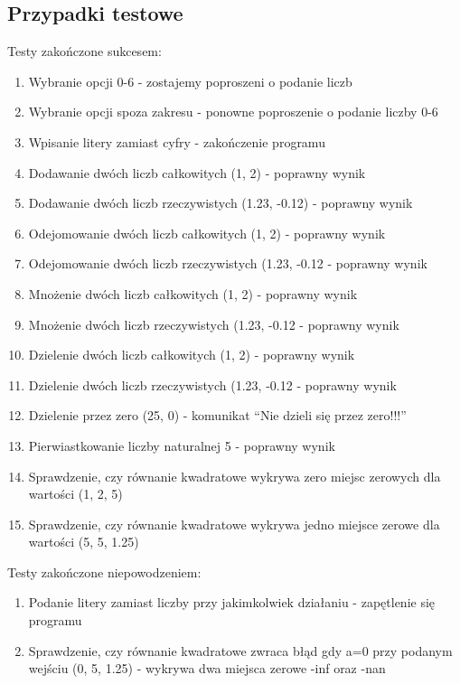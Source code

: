 \documentclass{article}
\begin{document}
\subsection{Przypadki testowe}
Testy zakończone sukcesem:
\begin{enumerate}
\item Wybranie opcji 0-6 - zostajemy poproszeni o podanie liczb
\item Wybranie opcji spoza zakresu - ponowne poproszenie o podanie liczby 0-6
\item Wpisanie litery zamiast cyfry - zakończenie programu
\item Dodawanie dwóch liczb całkowitych (1, 2) - poprawny wynik
\item Dodawanie dwóch liczb rzeczywistych (1.23, -0.12) - poprawny wynik
\item Odejomowanie dwóch liczb całkowitych (1, 2) - poprawny wynik
\item Odejomowanie dwóch liczb rzeczywistych (1.23, -0.12 - poprawny wynik
\item Mnożenie dwóch liczb całkowitych (1, 2) - poprawny wynik
\item Mnożenie dwóch liczb rzeczywistych (1.23, -0.12 - poprawny wynik
\item Dzielenie dwóch liczb całkowitych (1, 2) - poprawny wynik
\item Dzielenie dwóch liczb rzeczywistych (1.23, -0.12 - poprawny wynik
\item Dzielenie przez zero (25, 0) - komunikat ``Nie dzieli się przez zero!!!''
\item Pierwiastkowanie liczby naturalnej 5 - poprawny wynik
\item Sprawdzenie, czy równanie kwadratowe wykrywa zero miejsc zerowych dla wartości (1, 2, 5)
\item Sprawdzenie, czy równanie kwadratowe wykrywa jedno miejsce zerowe dla wartości (5, 5, 1.25)

  

\end{enumerate}
Testy zakończone niepowodzeniem:
\begin{enumerate}

\item Podanie litery zamiast liczby przy jakimkolwiek działaniu - zapętlenie się programu
\item Sprawdzenie, czy równanie kwadratowe zwraca błąd gdy a=0 przy podanym wejściu (0, 5, 1.25) - wykrywa dwa miejsca zerowe -inf oraz -nan  

\end{enumerate}
\end{document}
